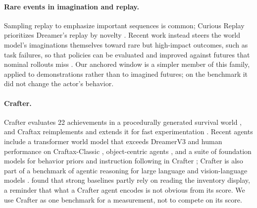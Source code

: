 \paragraph{Rare events in imagination and replay.}
Sampling replay to emphasize important sequences is common; Curious Replay prioritizes Dreamer's replay by novelty \citep{kauvar2023curious}.
Recent work instead steers the world model's imaginations themselves toward rare but high-impact outcomes, such as task failures, so that policies can be evaluated and improved against futures that nominal rollouts miss \citep{seo2026stressdream}.
Our anchored window is a simpler member of this family, applied to demonstrations rather than to imagined futures; on the benchmark it did not change the actor's behavior.

\paragraph{Crafter.}
Crafter evaluates 22 achievements in a procedurally generated survival world \citep{hafner2022crafter}, and Craftax reimplements and extends it for fast experimentation \citep{matthews2024craftax}.
Recent agents include a transformer world model that exceeds DreamerV3 and human performance on Craftax-Classic \citep{dedieu2025improving}, object-centric agents \citep{stanic2023crafterood}, and a suite of foundation models for behavior priors and instruction following in Crafter \citep{park2025crafterdojo}; Crafter is also part of a benchmark of agentic reasoning for large language and vision-language models \citep{paglieri2025balrog}.
\citet{stanic2023crafterood} found that strong baselines partly rely on reading the inventory display, a reminder that what a Crafter agent encodes is not obvious from its score.
We use Crafter as one benchmark for a measurement, not to compete on its score.
